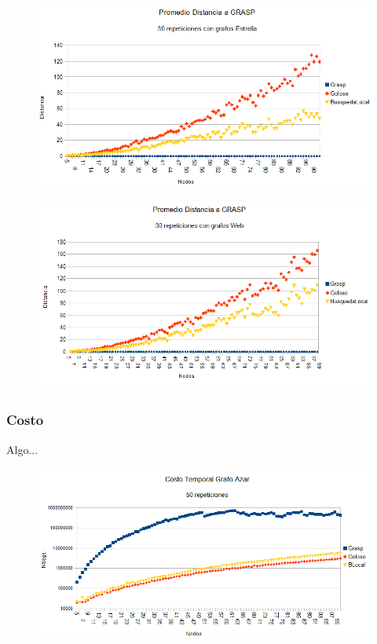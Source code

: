\begin{figure}[H]
	\centering
	\includegraphics[scale=0.6]{distancia-Grasp-Star.png}
\end{figure}

\begin{figure}[H]
	\centering
	\includegraphics[scale=0.6]{distancia-Grasp-Web.png}
\end{figure}

\subsubsection{Costo}

\quad Algo...

\begin{figure}[H]
	\centering
	\includegraphics[scale=0.6]{timingAzar.png}
\end{figure}

